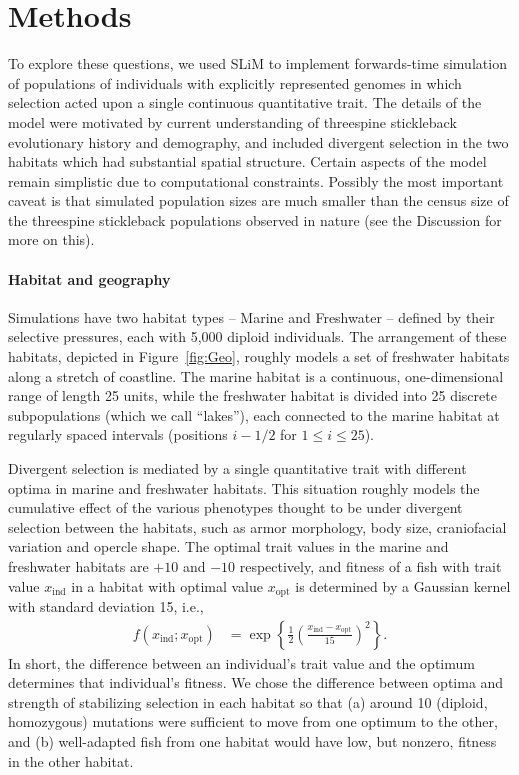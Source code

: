\documentclass{article}
\begin{document}
\section*{Methods}

To explore these questions, we used SLiM \citep{haller2017slim,haller2018slim3} 
to implement forwards-time simulation of populations of individuals with explicitly represented genomes
in which selection acted upon a single continuous quantitative trait.
The details of the model were motivated by current understanding of threespine stickleback evolutionary history and demography,
and included divergent selection in the two habitats which had substantial spatial structure.
Certain aspects of the model remain simplistic due to computational constraints.
Possibly the most important caveat is that simulated population sizes 
are much smaller than the census size of the threespine stickleback populations observed in nature
(see the Discussion for more on this).

\paragraph{Habitat and geography}
Simulations have two habitat types -- Marine and Freshwater -- defined by their selective pressures,
each with 5,000 diploid individuals.
The arrangement of these habitats, depicted in Figure~\ref{fig:Geo},
roughly models a set of freshwater habitats along a stretch of coastline. 
The marine habitat is a continuous, one-dimensional range of length 25 units,
while the freshwater habitat is divided into 25 discrete subpopulations (which we call ``lakes''),
each connected to the marine habitat at regularly spaced intervals
(positions $i - 1/2$ for $1 \le i \le 25$).

Divergent selection is mediated by a single quantitative trait
with different optima in marine and freshwater habitats.
This situation roughly models the cumulative effect of the various phenotypes 
thought to be under divergent selection between the habitats,
such as armor morphology, body size, craniofacial variation and opercle shape.
The optimal trait values in the marine and freshwater habitats are $+10$ and $-10$ respectively,
and fitness of a fish with trait value $x_\text{ind}$ in a habitat with optimal value $x_\text{opt}$
is determined by a Gaussian kernel with standard deviation 15, i.e.,
\begin{align*}
    f(x_\text{ind}; x_\text{opt})
    &=
    \exp\left\{
        \frac{1}{2}
            \left(
            \frac{x_\text{ind}-x_\text{opt}}{15}
            \right)^2
        \right\} .
\end{align*}
In short, the difference between an individual's trait value and the optimum determines that individual's fitness. 
We chose the difference between optima and strength of stabilizing selection in each habitat
so that 
(a) around 10 (diploid, homozygous) mutations were sufficient to move from one optimum to the other,
and (b) well-adapted fish from one habitat would have low, but nonzero, fitness in the other habitat.
\end{document}
